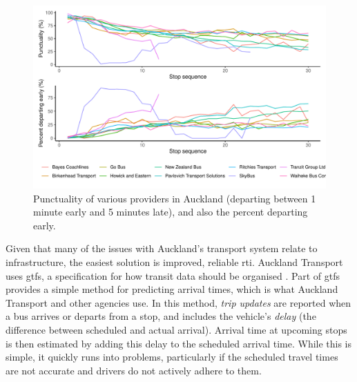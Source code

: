 \begin{knitrout}\small
{}\color{fgcolor}\begin{figure}
\includegraphics[width=\linewidth]{figure/schedule_adhere-1} \caption[Punctuality of various providers in Auckland (departing between 1 minute early and 5 minutes late), and also the percent departing early]{Punctuality of various providers in Auckland (departing between 1 minute early and 5 minutes late), and also the percent departing early.}\label{fig:schedule_adhere}
\end{figure}


\end{knitrout}



Given that many of the issues with Auckland's transport system relate to infrastructure, the easiest solution is improved, reliable \gls{rti}. Auckland Transport uses \gls{gtfs}, a specification for how transit data should be organised \citep{GoogleDevelopers_2006}. Part of \gls{gtfs} provides a simple method for predicting arrival times, which is what Auckland Transport and other agencies use. In this method, \emph{trip updates} are reported when a bus arrives or departs from a stop, and includes the vehicle's \emph{delay} (the difference between scheduled and actual arrival). Arrival time at upcoming stops is then estimated by adding this delay to the scheduled arrival time. While this is simple, it quickly runs into problems, particularly if the scheduled travel times are not accurate and drivers do not actively adhere to them.


